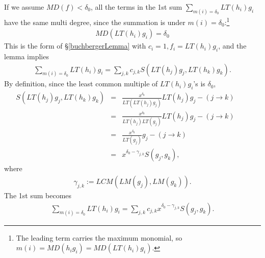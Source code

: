 \documentclass[11pt]{book}
\begin{document}
If we assume $MD(f) < \delta_0$, all the terms in the 1st sum $\sum_{m(i) = \delta_0} LT(h_i) g_i $ have the same multi degree, since the summation is under $m(i) = \delta_0$:\footnote{The leading term carries the maximum monomial, so $m(i) = MD(h_i g_i) = MD\left( LT(h_i) g_i  \right)$.}
\begin{eqnarray}
MD\left( LT(h_i) g_i  \right) = \delta_0
\end{eqnarray}
This is the form of \S\ref{buchbergerLemma} with $c_i =1, f_i = LT(h_i) g_i$, and the lemma implies
\begin{eqnarray}
\sum_{m(i) = \delta_0} LT(h_i) g_i = \sum_{j,k}c_{j,k} S\left(LT(h_j) g_j, LT(h_k) g_k \right).
\end{eqnarray}
By definition, since the least common multiple of $LT(h_i) g_i$'s is $\delta_0$, 
\begin{eqnarray}
S\left(LT(h_j) g_j, LT(h_k) g_k \right) &=& \frac{x^{\delta_0}}{LT\left(LT(h_j) g_j \right)}LT(h_j) g_j - (j\to k) \qquad \\
&=& \frac{x^{\delta_0}}{LT(h_j) LT\left( g_j \right)}LT(h_j) g_j - (j\to k) \\
&=& \frac{x^{\delta_0}}{LT\left( g_j \right)} g_j - (j\to k) \\
&=& x^{\delta_0 - \gamma_{j,k}} S(g_j, g_k),
\end{eqnarray}
where
\begin{eqnarray}
\gamma_{j,k} := LCM\left(LM(g_j), LM(g_k) \right).
\end{eqnarray}
The 1st sum becomes
\begin{eqnarray}
\label{semiFinalResult}
\sum_{m(i) = \delta_0} LT(h_i) g_i = \sum_{j,k}c_{j,k} x^{\delta_0 - \gamma_{j,k}} S(g_j, g_k).
\end{eqnarray}
\end{document}
